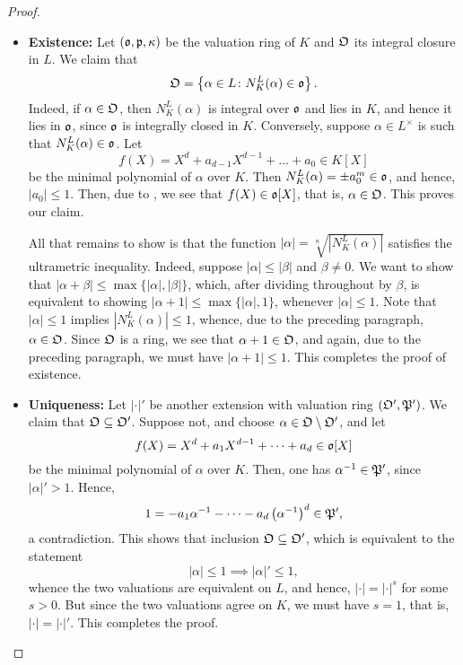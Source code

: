 \begin{proof}
\begin{itemize}
    \item\textbf{Existence:} Let $(\mathfrak{o}, \mathfrak{p},\kappa)$ be the valuation ring of $K$ and $\mathfrak{O}$ its integral closure in $L$. We claim that 
    \begin{equation*}
        \mathfrak{O} = \left\{\alpha\in L\colon N^L_K(\alpha)\in\mathfrak{o}\right\}.
    \end{equation*}
    Indeed, if $\alpha\in\mathfrak{O}$, then $N^L_K(\alpha)$ is integral over $\mathfrak{o}$ and lies in $K$, and hence it lies in $\mathfrak{o}$, since $\mathfrak{o}$ is integrally closed in $K$. Conversely, suppose $\alpha\in L^\times$ is such that $N^L_K(\alpha)\in\mathfrak{o}$. Let 
    \begin{equation*}
        f(X) = X^d + a_{d - 1}X^{d - 1} + \dots + a_0\in K[X]
    \end{equation*}
    be the minimal polynomial of $\alpha$ over $K$. Then $N^L_K(\alpha) = \pm a_0^m\in\mathfrak{o}$, and hence, $|a_0|\le 1$. Then, due to , we see that $f(X)\in\mathfrak{o}[X]$, that is, $\alpha\in\mathfrak{O}$. This proves our claim.

    All that remains to show is that the function $|\alpha| = \sqrt[n]{\left|N^L_K(\alpha)\right|}$ satisfies the ultrametric inequality. Indeed, suppose $|\alpha|\le|\beta|$ and $\beta\ne 0$. We want to show that $|\alpha + \beta|\le \max\{|\alpha|, |\beta|\}$, which, after dividing throughout by $\beta$, is equivalent to showing $|\alpha + 1|\le\max\{|\alpha|, 1\}$, whenever $|\alpha|\le 1$. Note that $|\alpha|\le 1$ implies $\left|N^L_K(\alpha)\right|\le 1$, whence, due to the preceding paragraph, $\alpha\in\mathfrak{O}$. Since $\mathfrak{O}$ is a ring, we see that $\alpha + 1\in\mathfrak{O}$, and again, due to the preceding paragraph, we must have $|\alpha + 1|\le 1$. This completes the proof of existence.

    \item\textbf{Uniqueness:} Let $|\cdot|'$ be another extension with valuation ring $(\mathfrak{O}',\mathfrak{P}')$. We claim that $\mathfrak{O}\subseteq\mathfrak{O}'$. Suppose not, and choose $\alpha\in\mathfrak{O}\setminus\mathfrak{O}'$, and let 
    \begin{equation*}
        f(X) = X^d + a_1 X^{d - 1} + \dots + a_d\in\mathfrak{o}[X]
    \end{equation*}
    be the minimal polynomial of $\alpha$ over $K$. Then, one has $\alpha^{-1}\in\mathfrak{P}'$, since $|\alpha|' > 1$. Hence, 
    \begin{equation*}
        1 = -a_1\alpha^{-1} - \cdots - a_d\left(\alpha^{-1}\right)^d\in\mathfrak{P}',
    \end{equation*}
    a contradiction. This shows that inclusion $\mathfrak{O}\subseteq\mathfrak{O}'$, which is equivalent to the statement
    \begin{equation*}
        |\alpha|\le 1\implies |\alpha|'\le 1,
    \end{equation*}
    whence the two valuations are equivalent on $L$, and hence, $|\cdot| = |\cdot|^s$ for some $s > 0$. But since the two valuations agree on $K$, we must have $s = 1$, that is, $|\cdot| = |\cdot|'$. This completes the proof.\qedhere
\end{itemize}
\end{proof}

